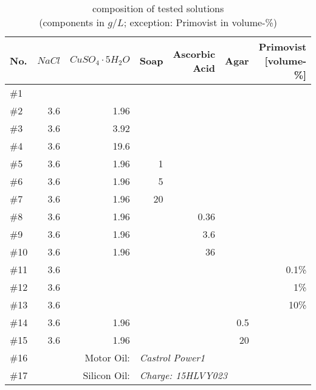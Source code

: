 \begin{table}[!hbt]
\centering
\begin{tabular}{@{}l|rrrrrr@{}}
No.   & $NaCl$   & $CuSO_4\cdot5H_2O$          & Soap & Ascorbic Acid & Agar & Primovist [volume-\%]\\
\toprule
\#1  &             &                   &      &               &           &		\\
\#2  & 3.6         & 1.96              &      &               &           &		\\
\#3  & 3.6         & 3.92              &      &               &           &		\\
\#4  & 3.6         & 19.6              &      &               &           &		\\
\#5  & 3.6         & 1.96              & 1    &               &           &		\\
\#6  & 3.6         & 1.96              & 5    &               &           &		\\
\#7  & 3.6         & 1.96              & 20   &               &           &		\\
\#8  & 3.6         & 1.96              &      & 0.36          &           &		\\
\#9  & 3.6         & 1.96              &      & 3.6           &           &		\\
\#10 & 3.6         & 1.96              &      & 36            &           &		\\
\#11 & 3.6         &                   &      &               &           & 0.1\%	\\
\#12 & 3.6         &                   &      &               &           & 1\%		\\
\#13 & 3.6         &                   &      &               &           & 10\%	\\
\#14 & 3.6         & 1.96              &      &               &  0.5      &		\\
\#15 & 3.6         & 1.96              &      &               &   20      &		\\
\midrule
\#16 & \multicolumn{2}{r}{Motor Oil:}   & \multicolumn{4}{l}{\textit{Castrol Power1}}      \\
\#17 & \multicolumn{2}{r}{Silicon Oil:} & \multicolumn{4}{l}{\textit{Charge: 15HLVY023}}   \\ \bottomrule
\end{tabular}
\caption{composition of tested solutions\\(components in $g/L$; exception: Primovist in volume-\%)}
\label{tab:solutions}
\end{table}

